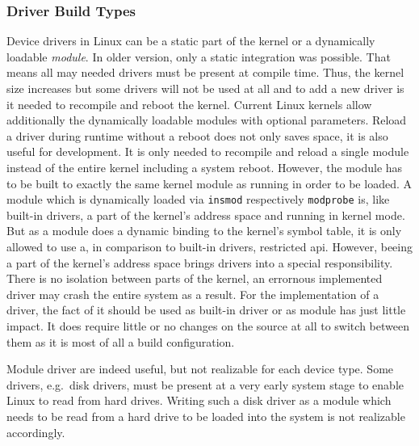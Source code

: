 \subsubsection*{Driver Build Types}
Device drivers in Linux can be a static part of the kernel or a dynamically loadable \textit{module}.
In older version, only a static integration was possible. That means all may needed drivers must be present at compile time.
Thus, the kernel size increases but some drivers will not be used at all and to add a new driver is it needed to recompile and reboot the kernel.
Current Linux kernels allow additionally the dynamically loadable modules with optional parameters.
Reload a driver during runtime without a reboot does not only saves space, it is also useful for development.
It is only needed to recompile and reload a single module instead of the entire kernel including a system reboot\cite{quade2016Linux}.
However, the module has to be built to exactly the same kernel module as running in order to be loaded.
A module which is dynamically loaded via \texttt{insmod} respectively \texttt{modprobe} is, like built-in drivers, a part of the kernel's address space and running in kernel mode.
But as a module does a dynamic binding to the kernel's symbol table, it is only allowed to use a, in comparison to built-in drivers, restricted \ac{api}\cite{glatz2015betriebssysteme}.
However, beeing a part of the kernel's address space brings drivers into a special responsibility.
There is no isolation between parts of the kernel, an errornous implemented driver may crash the entire system as a result.
For the implementation of a driver, the fact of it should be used as built-in driver or as module has just little impact.
It does require little or no changes on the source at all to switch between them as it is most of all a build configuration\cite{lfd430}.

Module driver are indeed useful, but not realizable for each device type.
Some drivers, e.g.\ disk drivers, must be present at a very early system stage to enable Linux to read from hard drives.
Writing such a disk driver as a module which needs to be read from a hard drive to be loaded into the system is not realizable accordingly\cite{quade2016Linux}.

